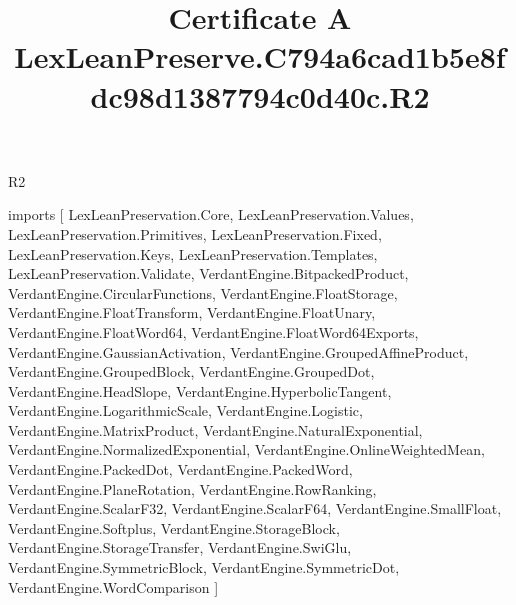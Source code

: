\begin{lexlean}{R2}
\title{Certificate A LexLeanPreserve.C794a6cad1b5e8fdc98d1387794c0d40c.R2}
\begin{coremodule}
imports [
  LexLeanPreservation.Core,
  LexLeanPreservation.Values,
  LexLeanPreservation.Primitives,
  LexLeanPreservation.Fixed,
  LexLeanPreservation.Keys,
  LexLeanPreservation.Templates,
  LexLeanPreservation.Validate,
  VerdantEngine.BitpackedProduct,
  VerdantEngine.CircularFunctions,
  VerdantEngine.FloatStorage,
  VerdantEngine.FloatTransform,
  VerdantEngine.FloatUnary,
  VerdantEngine.FloatWord64,
  VerdantEngine.FloatWord64Exports,
  VerdantEngine.GaussianActivation,
  VerdantEngine.GroupedAffineProduct,
  VerdantEngine.GroupedBlock,
  VerdantEngine.GroupedDot,
  VerdantEngine.HeadSlope,
  VerdantEngine.HyperbolicTangent,
  VerdantEngine.LogarithmicScale,
  VerdantEngine.Logistic,
  VerdantEngine.MatrixProduct,
  VerdantEngine.NaturalExponential,
  VerdantEngine.NormalizedExponential,
  VerdantEngine.OnlineWeightedMean,
  VerdantEngine.PackedDot,
  VerdantEngine.PackedWord,
  VerdantEngine.PlaneRotation,
  VerdantEngine.RowRanking,
  VerdantEngine.ScalarF32,
  VerdantEngine.ScalarF64,
  VerdantEngine.SmallFloat,
  VerdantEngine.Softplus,
  VerdantEngine.StorageBlock,
  VerdantEngine.StorageTransfer,
  VerdantEngine.SwiGlu,
  VerdantEngine.SymmetricBlock,
  VerdantEngine.SymmetricDot,
  VerdantEngine.WordComparison
]


\end{coremodule}
\end{lexlean}
